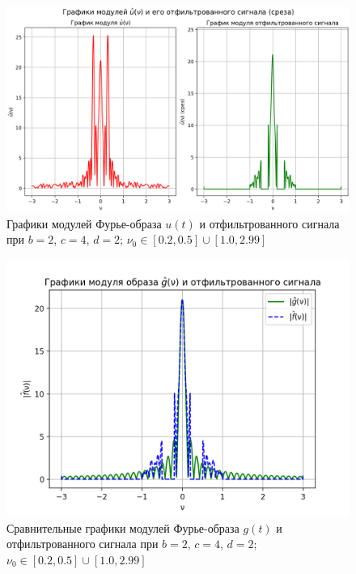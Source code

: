 \begin{figure}[ht!]
    \centering
    \includegraphics[scale=0.55]{media/1 task/specific_freq/Fourier_Image_2_4_2_-0,5_-0,2_-2,99_-1,0.png}
    \caption{Графики модулей Фурье-образа $u(t)$ и отфильтрованного сигнала при $b=2$, $c=4$, $d=2$; $\nu_0 \in [0.2, 0.5] \cup [1.0, 2.99]$}
    \label{fig:four_2_4_2_2}
\end{figure}

\begin{figure}[ht!]
    \centering
    \includegraphics[scale=0.55]{media/1 task/specific_freq/Fourier_Image_Comparison_2_4_2_-0,5_-0,2_-2,99_-1,0.png}
    \caption{Сравнительные графики модулей Фурье-образа $g(t)$ и отфильтрованного сигнала при $b=2$, $c=4$, $d=2$; $\nu_0 \in [0.2, 0.5] \cup [1.0, 2.99]$}
    \label{fig:fourc_2_4_2_2}
\end{figure}

